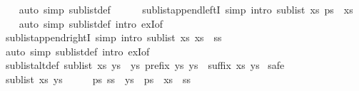 \begin{isabellebody}
%
\isadelimproof
\ \ %
\endisadelimproof
%
\isatagproof
{}\isamarkupfalse%
\ {\isacharparenleft}auto\ simp{\isacharcolon}\ sublist{\isacharunderscore}def{\isacharparenright}%
\endisatagproof
{\isafoldproof}%
%
\isadelimproof
\isanewline
%
\endisadelimproof
\ \ \ \ \isanewline
{}\isamarkupfalse%
\ sublist{\isacharunderscore}append{\isacharunderscore}leftI\ {\isacharbrackleft}simp{\isacharcomma}\ intro{\isacharbrackright}{\isacharcolon}\ {\isachardoublequoteopen}sublist\ xs\ {\isacharparenleft}ps\ {\isacharat}\ xs{\isacharparenright}{\isachardoublequoteclose}\isanewline
%
\isadelimproof
\ \ %
\endisadelimproof
%
\isatagproof
{}\isamarkupfalse%
\ {\isacharparenleft}auto\ simp{\isacharcolon}\ sublist{\isacharunderscore}def\ intro{\isacharcolon}\ exI{\isacharbrackleft}of\ {\isacharunderscore}\ {\isachardoublequoteopen}{\isacharbrackleft}{\isacharbrackright}{\isachardoublequoteclose}{\isacharbrackright}{\isacharparenright}%
\endisatagproof
{\isafoldproof}%
%
\isadelimproof
\isanewline
%
\endisadelimproof
\ \ \ \ \isanewline
{}\isamarkupfalse%
\ sublist{\isacharunderscore}append{\isacharunderscore}rightI\ {\isacharbrackleft}simp{\isacharcomma}\ intro{\isacharbrackright}{\isacharcolon}\ {\isachardoublequoteopen}sublist\ xs\ {\isacharparenleft}xs\ {\isacharat}\ ss{\isacharparenright}{\isachardoublequoteclose}\isanewline
%
\isadelimproof
\ \ %
\endisadelimproof
%
\isatagproof
{}\isamarkupfalse%
\ {\isacharparenleft}auto\ simp{\isacharcolon}\ sublist{\isacharunderscore}def\ intro{\isacharcolon}\ exI{\isacharbrackleft}of\ {\isacharunderscore}\ {\isachardoublequoteopen}{\isacharbrackleft}{\isacharbrackright}{\isachardoublequoteclose}{\isacharbrackright}{\isacharparenright}%
\endisatagproof
{\isafoldproof}%
%
\isadelimproof
\ \isanewline
%
\endisadelimproof
\isanewline
{}\isamarkupfalse%
\ sublist{\isacharunderscore}altdef{\isacharcolon}\ {\isachardoublequoteopen}sublist\ xs\ ys\ {\isasymlongleftrightarrow}\ {\isacharparenleft}{\isasymexists}ys{\isacharprime}{\isachardot}\ prefix\ ys{\isacharprime}\ ys\ {\isasymand}\ suffix\ xs\ ys{\isacharprime}{\isacharparenright}{\isachardoublequoteclose}\isanewline
%
\isadelimproof
%
\endisadelimproof
%
\isatagproof
{}\isamarkupfalse%
\ safe\isanewline
\ \ \isamarkupfalse%
\ {\isachardoublequoteopen}sublist\ xs\ ys{\isachardoublequoteclose}\isanewline
\ \ \isamarkupfalse%
\ \isamarkupfalse%
\ ps\ ss\ \ {\isachardoublequoteopen}ys\ {\isacharequal}\ ps\ {\isacharat}\ xs\ {\isacharat}\ ss{\isachardoublequoteclose}\ \isamarkupfalse%

\end{isabellebody}
